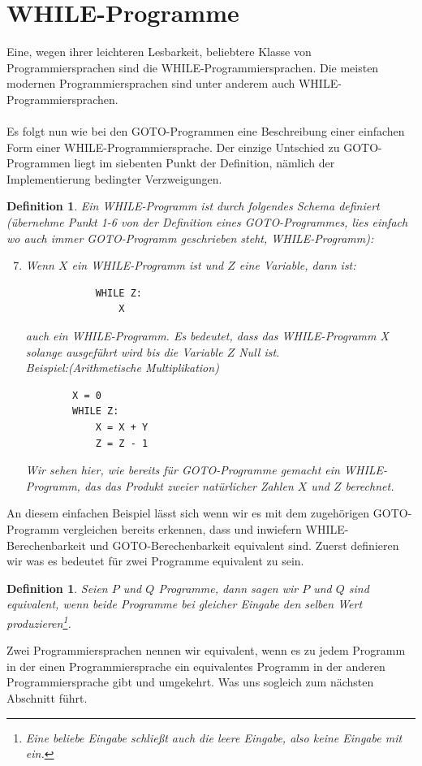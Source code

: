 \documentclass[11pt,a4paper,leqno]{report}
\newtheorem{definition}[theorem]{Definition}
\numberwithin{equation}{chapter}
\begin{document}
\section{WHILE-Programme}
Eine, wegen ihrer leichteren Lesbarkeit, beliebtere Klasse von Programmiersprachen sind die WHILE-Programmiersprachen. Die meisten modernen Programmiersprachen sind unter anderem auch WHILE-Programmiersprachen.\\
\\
Es folgt nun wie bei den GOTO-Programmen eine Beschreibung einer einfachen Form einer WHILE-Programmiersprache. Der einzige Untschied zu GOTO-Programmen liegt im siebenten Punkt der Definition, n\"amlich der Implementierung bedingter Verzweigungen.
\begin{definition}
	Ein WHILE-Programm ist durch folgendes Schema definiert (\"ubernehme Punkt 1-6 von der Definition eines GOTO-Programmes, lies einfach wo auch immer GOTO-Programm geschrieben steht, WHILE-Programm):
	\begin{enumerate}
 		\setcounter{enumi}{6}
		\item Wenn $X$ ein WHILE-Programm ist und $Z$ eine Variable, dann ist: 
		\begin{lstlisting}
			WHILE Z:
			    X
		\end{lstlisting}
		auch ein WHILE-Programm. Es bedeutet, dass das WHILE-Programm X solange ausgef\"uhrt wird bis die Variable $Z$ Null ist.\\
		Beispiel:(Arithmetische Multiplikation)
		\begin{lstlisting}
		X = 0
		WHILE Z:
		    X = X + Y
		    Z = Z - 1
		\end{lstlisting}	
		Wir sehen hier, wie bereits f\"ur GOTO-Programme gemacht ein WHILE-Programm, das das Produkt zweier nat\"urlicher Zahlen $X$ und $Z$ berechnet. 
	\end{enumerate}
\end{definition}
An diesem einfachen Beispiel l\"asst sich wenn wir es mit dem zugeh\"origen GOTO-Programm vergleichen bereits erkennen, dass und inwiefern WHILE-Berechenbarkeit und GOTO-Berechenbarkeit equivalent sind. Zuerst definieren wir was es bedeutet f\"ur zwei Programme equivalent zu sein.
\begin{definition}
	Seien $P$ und $Q$ Programme, dann sagen wir $P$ und $Q$ sind equivalent, wenn beide Programme bei gleicher Eingabe den selben Wert produzieren\footnote{Eine beliebe Eingabe schlie\ss{}t auch die leere Eingabe, also keine Eingabe mit ein.}.
\end{definition}
Zwei Programmiersprachen nennen wir equivalent, wenn es zu jedem Programm in der einen Programmiersprache ein equivalentes Programm in der anderen Programmiersprache gibt und umgekehrt. Was uns sogleich zum n\"achsten Abschnitt f\"uhrt.
\end{document}
